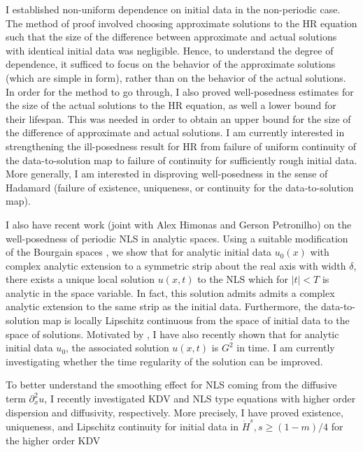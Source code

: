 \documentclass[12pt,reqno]{amsart}
\newcommand{\p}{\partial}
\begin{document}
I established non-uniform dependence on initial data
in the non-periodic case.
The method of proof involved choosing
approximate solutions to the HR equation such that the size of the difference between approximate and actual solutions with 
identical initial data was negligible. Hence, to understand the degree of 
dependence, it sufficed to focus on the behavior of the approximate 
solutions (which are simple in form), rather than on the behavior of the 
actual solutions. In order for the method to go through, I also proved 
well-posedness estimates for the size of the 
actual solutions to the HR equation, as well a 
lower bound for their lifespan. This was needed in order to obtain an upper
bound for the size of the difference of approximate and actual solutions. I am
currently interested in strengthening the ill-posedness result for HR from
failure of uniform continuity of the data-to-solution map to failure of
continuity for sufficiently rough initial data. More generally, I am interested
in disproving well-posedness in the sense of Hadamard (failure of existence,
uniqueness, or continuity for the data-to-solution map). 

I also have recent work (joint with Alex Himonas and Gerson Petronilho) on the
well-posedness of periodic NLS in analytic spaces. Using a suitable modification
of the Bourgain spaces \cite{Bourgain-Fourier-transfo}, we show that for analytic initial data $u_{0}(x)$ with
complex analytic extension to a symmetric strip about the real axis with width
$\delta$, there exists a unique local
solution $u(x,t)$ to the NLS which for $| t | < T$
is analytic in the space variable. In fact, this solution admits admits a
complex analytic extension to the same strip as the initial data. Furthermore,
the data-to-solution map is locally Lipschitz continuous from the space of
initial data to the space of solutions. Motivated by
\cite{Gorsky-The-Cauchy-prob}, I have also recently shown that for analytic
initial data $u_{0}$, the associated solution $u(x,t)$ is $G^{2}$ in time. I am
currently investigating whether the time regularity of the solution can be improved. 

To better understand the smoothing effect for NLS coming from the diffusive term
$\p_{x}^{2}u$, I
recently investigated KDV and NLS type equations with higher order
dispersion and diffusivity, respectively. More precisely, I have proved
existence, uniqueness, and Lipschitz continuity for initial data in
$\dot{H}^{s}, s \ge (1-m)/4$ for the higher order KDV
\end{document}
